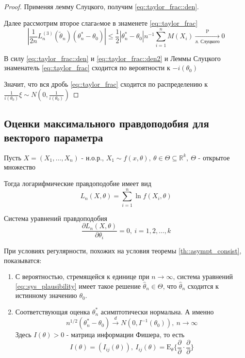 \documentclass[12pt]{article}
\theoremstyle{basic_theorem}
\theoremstyle{name_theorem}
\def\R{
    \mathbb{R}
}
\def\E{
    \mathrm{E}
}
\def\P{
    \mathrm{P}
}
\begin{document}
\begin{proof}
    Применяя лемму Слуцкого, получим \ref{eq::taylor_frac::den}.

    Далее рассмотрим второе слагаeмое в знаменете \ref{eq::taylor_frac}
    \begin{equation}
        \label{eq::taylor_frac::den2}
        |\frac{1}{2n} L_n^{(3)}(\widetilde{\theta}_n)(\theta^*_n - \theta_0)| \leq \frac{1}{2}|\theta_n^* - \theta_0| n^{-1} \sum_{i=1}^n M(X_i) \xrightarrow[\text{л. Слуцкого}]{\P} 0
    \end{equation}
    
    В силу \ref{eq::taylor_frac::den} и \ref{eq::taylor_frac::den2} и Леммы Слуцкого
    знаменатель \ref{eq::taylor_frac} сходится по вероятности к $-i(\theta_0)$

    Значит, что вся дробь \ref{eq::taylor_frac} сходится по распределению к
    $\frac{1}{i(\theta_0)} \xi \sim N(0, \frac{1}{i(\theta_0)})$
\end{proof}

\subsection*{Оценки максимального правдоподобия для векторого параметра}
    Пусть $X = (X_1, \ldots, X_n)$ - н.о.р., $X_1 \sim f(x, \theta),\ \theta\in\Theta\subseteq\R^k,\
    \Theta$ - открытое множество

    Тогда логарифмические правдоподобие имеет вид 
    $$L_n(X, \theta) = \sum_{i=1}^n\ln f(X_i, \theta)$$
    
    Система уравнений правдоподобия
    \begin{equation}
        \label{eq::sys_plausibility}
        \frac{\partial L_n(X, \theta)}{\partial\theta_i} = 0,\ i =1,2,\ldots,k
    \end{equation}
    
    При условиях регулярности, похожих на условия теоремы \ref{th::asympt_consist},
    показыватся:
    \begin{enumerate}
        \item С вероятностью, стремящейся к единице при $n \rightarrow \infty$,
            система уравнений \ref{eq::sys_plausibility} имеет такое решение $\hat{\theta}_n\in\Theta$,
            что $\hat{\theta}_n$ сходится к истинному значению $\theta_0$.
        \item Соответствующая оценка $\theta^*_n$ асимптотически нормальна. А именно
         $$n^{1/2}(\theta^*_n - \theta_0) \xrightarrow{d} N(0, I^{-1}(\theta_0)),\ n\rightarrow\infty$$
         Здесь $I(\theta) > 0$ - матрица информации Фишера, то есть
         $$I(\theta) = (I_{ij}(\theta)),\ I_{ij}(\theta) = \E_\theta \{\frac{\partial}{\partial} \cdot \frac{\partial}{\partial}\}$$ 
    \end{enumerate}
\end{document}
